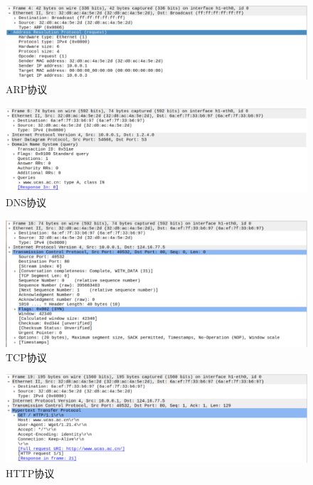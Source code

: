 \documentclass[UTF8]{article}
\begin{document}
\begin{figure}[H]
  \centering
  \includegraphics[width=\textwidth]{ARP.png}
  \caption{ARP协议}
\end{figure}

\begin{figure}[H]
  \centering
  \includegraphics[width=\textwidth]{DNS.png}
  \caption{DNS协议}
\end{figure}

\begin{figure}[H]
  \centering
  \includegraphics[width=\textwidth]{TCP.png}
  \caption{TCP协议}
\end{figure}

\begin{figure}[H]
  \centering
  \includegraphics[width=\textwidth]{HTTP.png}
  \caption{HTTP协议}
\end{figure}
\end{document}

